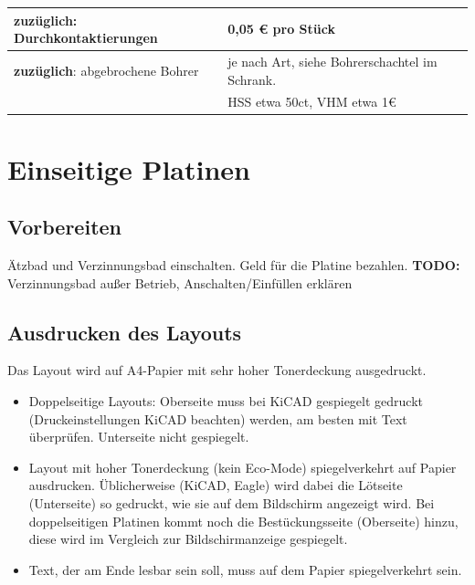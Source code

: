 \documentclass{\basedir/fablab-document}
\begin{document}
\vspace{1.5em}

\begin{tabularx}{36em}{l|X}
\textbf{zuzüglich}: Durchkontaktierungen & 0,05 € pro Stück \\ \hline
\textbf{zuzüglich}: abgebrochene Bohrer & je nach Art, siehe Bohrerschachtel im Schrank. \\
 & HSS etwa 50ct, VHM etwa 1€ \\
\end{tabularx}


\section{Einseitige Platinen}
\secttoc

\subsection{Vorbereiten}
\label{sec:vorbereiten}
Ätzbad und Verzinnungsbad einschalten. Geld für die Platine bezahlen. \textbf{TODO: } Verzinnungsbad außer Betrieb, Anschalten/Einfüllen erklären

\subsection{Ausdrucken des Layouts}
\label{sec:ausdrucken}
Das Layout wird auf A4-Papier mit sehr hoher Tonerdeckung ausgedruckt.
\begin{itemize}
\item Doppelseitige Layouts: Oberseite muss bei KiCAD gespiegelt gedruckt (Druckeinstellungen KiCAD beachten) werden, am besten mit Text überprüfen. Unterseite nicht gespiegelt.
\item Layout mit hoher Tonerdeckung (kein Eco-Mode) spiegelverkehrt auf Papier ausdrucken. Üblicherweise (KiCAD, Eagle) wird dabei die Lötseite (Unterseite) so gedruckt, wie sie auf dem Bildschirm angezeigt wird. Bei doppelseitigen Platinen kommt noch die Bestückungsseite (Oberseite) hinzu, diese wird im Vergleich zur Bildschirmanzeige gespiegelt.
\item Text, der am Ende lesbar sein soll, muss auf dem Papier spiegelverkehrt sein.
\end{itemize}
\end{document}
